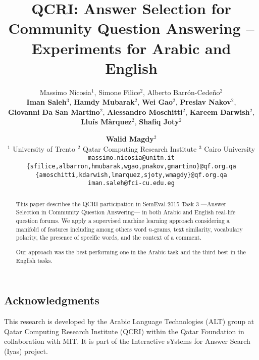 \documentclass[11pt,letterpaper]{article}
\title{%
QCRI: Answer Selection for Community Question Answering -- \\ Experiments for 
Arabic and English
}
\author{%
Massimo Nicosia$^1$, Simone Filice$^2$, Alberto Barr\'on-Cede\~no$^2$  \\
{\bf Iman Saleh}$^3$, {\bf Hamdy Mubarak}$^2$, {\bf Wei Gao$^2$}, 
{\bf Preslav Nakov$^2$}, \\
{\bf Giovanni Da San Martino$^2$}, {\bf Alessandro Moschitti}$^2$,
{\bf Kareem Darwish$^2$}, \\ 
{\bf Llu\'is M\`arquez$^2$}, {\bf Shafiq Joty$^2$} \and {\bf Walid Magdy$^2$} 
\\
$^1$ University of Trento \hspace{1em}
$^2$ Qatar Computing Research Institute	\hspace{1em}
$^3$ Cairo University \\
\small
{\tt massimo.nicosia@unitn.it}	\\
\small
{\tt \{sfilice,albarron,hmubarak,wgao,pnakov,gmartino\}@qf.org.qa} 	\\
\small
{\tt \{amoschitti,kdarwish,lmarquez,sjoty,wmagdy\}@qf.org.qa}	\\
\small
{\tt iman.saleh@fci-cu.edu.eg}
% 
% 
% 
% 
% 
}
\date{}
\begin{document}
\maketitle
\begin{abstract}
This paper describes the QCRI participation in SemEval-2015 Task 3 ---Answer 
Selection in Community Question Answering--- in both Arabic and English 
real-life question forums. We apply a supervised machine learning approach 
considering a manifold of features including among others word $n$-grams, text 
similarity, vocabulary polarity, the presence of specific words, and the context 
of a comment.

Our approach was the best performing one in the Arabic task and the third 
best in the English tasks.
\end{abstract}


% 





\begin{footnotesize}
\section*{Acknowledgments}
This research is developed by the Arabic Language Technologies (ALT) group at Qatar Computing Research Institute (QCRI) within the Qatar Foundation in collaboration with MIT. It is part of the Interactive sYstems for Answer Search (Iyas) project.
\end{footnotesize}





% 
% 
% 
% 

\end{document}
